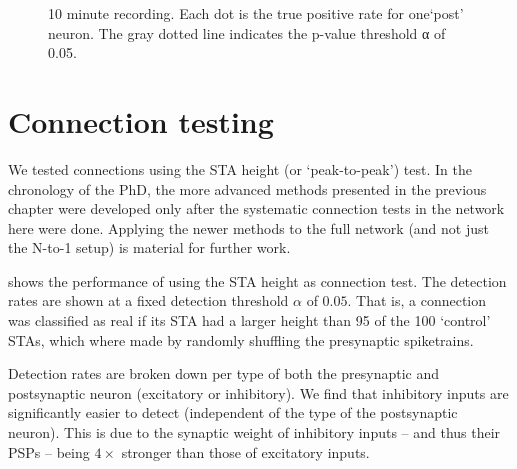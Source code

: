 \begin{figure}
    {10 minute recording. Each dot is the true positive rate for one`post' neuron. The gray dotted line indicates the p-value threshold α of 0.05.}
    \label{fig:net-perf}
    \vspace*{2em}
\end{figure}


\section{Connection testing}

We tested connections using the STA height (or `peak-to-peak') test. In the chronology of the PhD, the more advanced methods presented in the previous chapter were developed only after the systematic connection tests in the network here were done. Applying the newer methods to the full network (and not just the N-to-1 setup) is material for further work.

 shows the performance of using the STA height as connection test. The detection rates are shown at a fixed detection threshold $α$ of $0.05$. That is, a connection was classified as real if its STA had a larger height than 95 of the 100 `control' STAs, which where made by randomly shuffling the presynaptic spiketrains.

Detection rates are broken down per type of both the presynaptic and postsynaptic neuron (excitatory or inhibitory). We find that inhibitory inputs are significantly easier to detect (independent of the type of the postsynaptic neuron). This is due to the synaptic weight of inhibitory inputs -- and thus their PSPs -- being $4×$ stronger than those of excitatory inputs.

